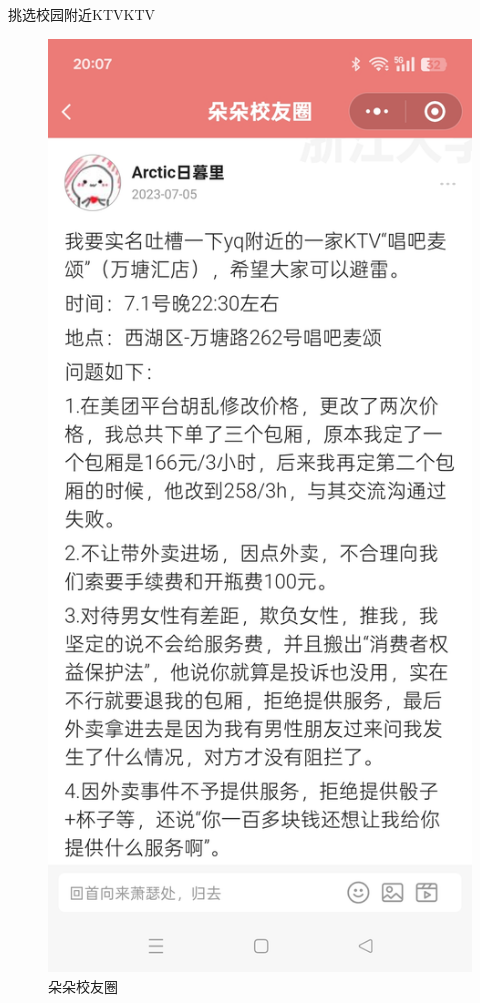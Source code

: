 \documentclass{amznotes}
\begin{document}
\begin{exbox}{挑选校园附近KTV}{KTV}
\begin{enumerate}
  \begin{figure}[H]
    \centering
    \includegraphics[width=.5\textwidth]{./figures/生活/ktv/d1.jpg}
    \caption{朵朵校友圈}
  \end{figure}
  \end{enumerate}
\end{exbox}
\end{document}
